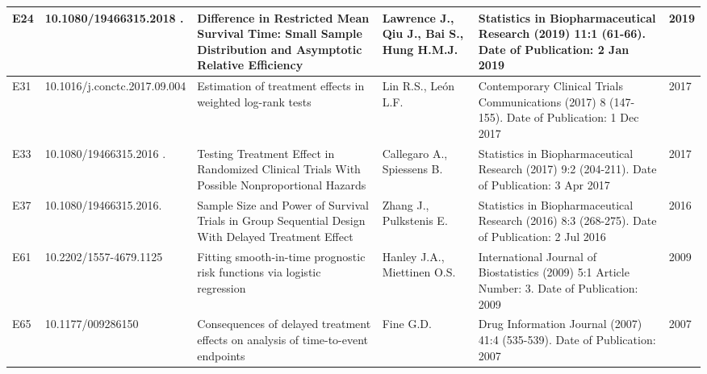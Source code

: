 \begin{landscape}
\begin{longtable}{|p{0.3in}|p{1.8in}|p{2.4in}|p{0.68in}|p{0.89in}|p{0.3in}|}
E24 & 10.1080/19466315.2018 .\-1527249  & Difference in Restricted Mean Survival Time: Small Sample Distribution and Asymptotic Relative Efficiency & Lawrence J., Qiu J., Bai S., Hung H.M.J. & Statistics in Biopharmaceutical Research (2019) 11:1 (61-66). Date of Publication: 2 Jan 2019 & 2019 \\ \hline 
E31 & 10.1016/j.conctc.2017.09.004   & Estimation of treatment effects in weighted log-rank tests & Lin R.S., Le\'{o}n L.F. & Contemporary Clinical Trials Communications (2017) 8 (147-155). Date of Publication: 1 Dec 2017 & 2017 \\ \hline 
E33 & 10.1080/19466315.2016 .\-1257436  & Testing Treatment Effect in Randomized Clinical Trials With Possible Nonproportional Hazards & Callegaro A., Spiessens B. & Statistics in Biopharmaceutical Research (2017) 9:2 (204-211). Date of Publication: 3 Apr 2017 & 2017 \\ \hline 
E37 & 10.1080/19466315.2016.\-1207560  & Sample Size and Power of Survival Trials in Group Sequential Design With Delayed Treatment Effect & Zhang J., Pulkstenis E. & Statistics in Biopharmaceutical Research (2016) 8:3 (268-275). Date of Publication: 2 Jul 2016 & 2016 \\ \hline 
E61 & 10.2202/1557-4679.1125  & Fitting smooth-in-time prognostic risk functions via logistic regression & Hanley J.A., Miettinen O.S. & International Journal of Biostatistics (2009) 5:1 Article Number: 3. Date of Publication: 2009 & 2009 \\ \hline 
E65 & 10.1177/009286150\-704100412  & Consequences of delayed treatment effects on analysis of time-to-event endpoints & Fine G.D. & Drug Information Journal (2007) 41:4 (535-539). Date of Publication: 2007 & 2007 \\ \hline 
\end{longtable}

\end{landscape}

